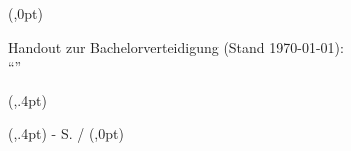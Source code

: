 %
    {
        (\textwidth,0pt)%
        {
        }
        {
        }
        {
            \parbox{\textwidth}{
                \centering
                {\footnotesize \sffamily Handout zur Bachelorverteidigung (Stand \today):}\\
                \enquote{\large \thesisTitle}
                \vspace{6pt}
            }            
        }
        (\textwidth,.4pt)
    }
    {
        (\textwidth,.4pt)%
        {
        }
        {
        }
        {
            \centering
            \footnotesize
            \textbf{\thesisAuthor}\hfill{\scriptsize\thesisUniversity{} - \thesisUniversityDepartment{}}\hfill
            S. \pagemark{} / \pageref{lastpage}
        }%
        (\textwidth,0pt)
    }

\setlength{\headsep}{14mm}